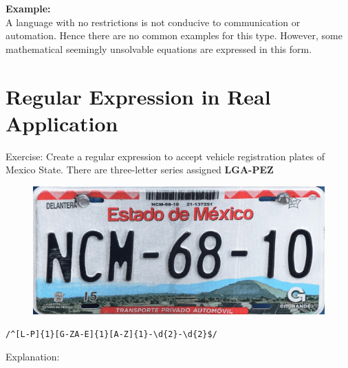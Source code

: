 \documentclass[
	12pt, %
]{fphw}
\begin{document}
\textbf{Example:}\\

A language with no restrictions is not conducive to communication or automation. Hence there are no common examples for this type. However, some mathematical seemingly unsolvable equations are expressed in this form.


\newpage
\section*{{\color{RoyalPurple}Regular Expression in Real Application}}

Exercise: Create a regular expression to accept vehicle registration plates of Mexico State. There are three-letter series assigned \textbf{LGA-PEZ}

\begin{figure}[H]
  \centering
  \includegraphics[scale=0.4]{images/placa_auto.png}
\end{figure}

\begin{verbatim}
/^[L-P]{1}[G-ZA-E]{1}[A-Z]{1}-\d{2}-\d{2}$/
\end{verbatim}

Explanation:\\
\end{document}
